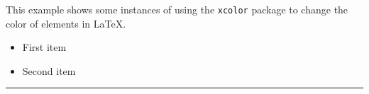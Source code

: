\documentclass{article}
\begin{document}
	This example shows some instances of using the \texttt{xcolor} package 
	to change the color of elements in \LaTeX.
	
	\begin{itemize}
		\color{blue}
		\item First item
		\item Second item
	\end{itemize}
	
	\noindent
	{\color{red} \rule{\linewidth}{0.5mm}}
\end{document}
